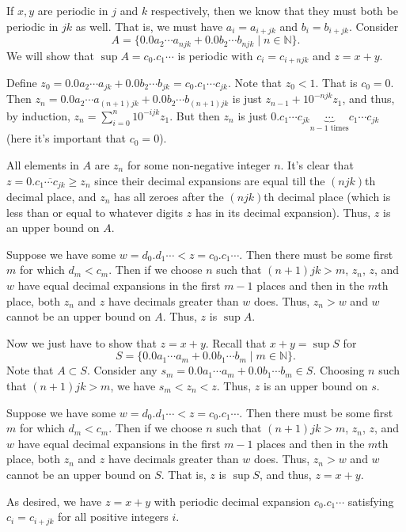 \documentclass[12 pt, letterpaper]{hmcpset}
\begin{document}
\begin{solution}
	If $x, y$ are periodic in $j$ and $k$ respectively, then we know that they must both be periodic in $jk$ as well. That is, we must have $a_{i} = a_{i + jk}$ and $b_{i} = b_{i + jk}$. Consider
	\[
		A = \{ 0.0 a_{2} \cdots a_{njk} + 0.0 b_{2} \cdots b_{njk} \mid n \in \mathbb{N} \}.
	\]
	We will show that $\sup A = c_{0}.c_{1} \cdots$ is periodic with  $c_{i} = c_{i + njk}$ and $z = x + y$.

	Define $z_{0} = 0.0 a_{2} \cdots a_{jk} + 0.0 b_{2} \cdots b_{jk} = c_{0}.c_{1} \cdots c_{jk}$. Note that $z_{0} < 1$. That is $c_{0} = 0$. Then $z_n = 0.0 a_{2} \cdots a_{(n + 1)jk} + 0.0 b_{2} \cdots b_{(n + 1)jk}$ is just $z_{n - 1} + 10^{-njk} z_{1}$, and thus, by induction, $z_{n} = \sum_{i = 0}^{n} 10^{-ijk} z_{1}$. But then $z_{n}$ is just $0.c_{1} \cdots c_{jk}  \underbrace{\cdots}_{n - 1 \text{ times}} c_{1} \cdots c_{jk}$ (here it's important that $c_{0} = 0$). 

	All elements in $A$ are $z_{n}$ for some non-negative integer $n$. It's clear that $z = 0.\overline{c_{1} \cdots c_{jk}} \ge z_{n}$ since their decimal expansions are equal till the $(njk)$th decimal place, and $z_{n}$ has all zeroes after the $(njk)$th decimal place (which is less than or equal to whatever digits $z$ has in its decimal expansion). Thus, $z$ is an upper bound on $A$.

	Suppose we have some $w = d_{0}.d_{1} \cdots < z = c_{0}.c_{1} \cdots$. Then there must be some first $m$ for which $d_{m} < c_{m}$. Then if we choose $n$ such that  $(n + 1)jk > m$, $z_{n}$, $z$, and $w$ have equal decimal expansions in the first $m - 1$ places and then in the $m$th place, both $z_{n}$ and $z$ have decimals greater than $w$ does. Thus, $z_{n} > w$ and $w$ cannot be an upper bound on $A$. Thus, $z$ is $\sup A$.

	Now we just have to show that $z = x + y$. Recall that $x + y = \sup S$ for
	\[
		S = \{ 0.0 a_{1} \cdots a_{m} + 0.0 b_{1} \cdots b_{m} \mid m \in \mathbb{N} \}.
	\]
	Note that $A \subset S$. Consider any $s_{m} = 0.0 a_{1} \cdots a_{m} + 0.0 b_{1} \cdots b_{m} \in S$. Choosing $n$ such that $(n + 1)jk > m$, we have $s_{m} < z_{n} < z$. Thus, $z$ is an upper bound on $s$. 

	Suppose we have some $w = d_{0}.d_{1} \cdots < z = c_{0}.c_{1} \cdots$. Then there must be some first $m$ for which $d_{m} < c_{m}$. Then if we choose $n$ such that  $(n + 1)jk > m$, $z_{n}$, $z$, and $w$ have equal decimal expansions in the first $m - 1$ places and then in the $m$th place, both $z_{n}$ and $z$ have decimals greater than $w$ does. Thus, $z_{n} > w$ and $w$ cannot be an upper bound on $S$. That is, $z$ is $\sup S$, and thus, $z = x + y$.

	As desired, we have $z = x + y$ with periodic decimal expansion $c_{0}.c_{1} \cdots$ satisfying $c_{i} = c_{i + jk}$ for all positive integers $i$.
\end{solution}
\end{document}
